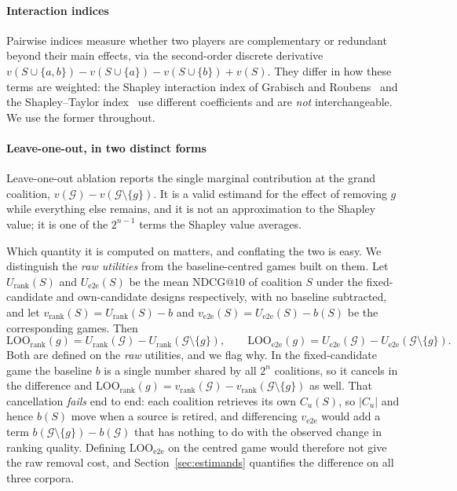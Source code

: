 \documentclass[pdflatex,sn-basic,Numbered]{sn-jnl}
\makeatletter
\theoremstyle{plain}
\theoremstyle{definition}
\newcommand{\G}{\mathcal{G}}
\newcommand{\NDCG}{\mathrm{NDCG@10}}
\newcommand{\LOOr}{\mathrm{LOO}_{\mathrm{rank}}}
\newcommand{\LOOe}{\mathrm{LOO}_{\mathrm{e2e}}}
\makeatother
\begin{document}
\paragraph{Interaction indices}
Pairwise indices measure whether two players are complementary or redundant
beyond their main effects, via the second-order discrete derivative
$v(S\cup\{a,b\}) - v(S\cup\{a\}) - v(S\cup\{b\}) + v(S)$. They differ in how
these terms are weighted: the Shapley interaction index of Grabisch and
Roubens~\citep{grabisch1999interaction} and the Shapley--Taylor
index~\citep{sundararajan2020shapleytaylor} use different coefficients and are
\emph{not} interchangeable. We use the former throughout.

\paragraph{Leave-one-out, in two distinct forms}
Leave-one-out ablation reports the single marginal contribution at the grand
coalition, $v(\G) - v(\G\setminus\{g\})$. It is a valid estimand for the effect
of removing $g$ while everything else remains, and it is not an approximation
to the Shapley value; it is one of the $2^{n-1}$ terms the Shapley value
averages.

Which quantity it is computed on matters, and conflating the two is easy. We
distinguish the \emph{raw utilities} from the baseline-centred games built on
them. Let $U_{\mathrm{rank}}(S)$ and $U_{\mathrm{e2e}}(S)$ be the mean
$\NDCG$ of coalition $S$ under the fixed-candidate and own-candidate designs
respectively, with no baseline subtracted, and let
$v_{\mathrm{rank}}(S) = U_{\mathrm{rank}}(S) - b$ and
$v_{\mathrm{e2e}}(S) = U_{\mathrm{e2e}}(S) - b(S)$ be the corresponding games.
Then
%
\begin{equation}
\LOOr(g) = U_{\mathrm{rank}}(\G) - U_{\mathrm{rank}}(\G\setminus\{g\}),
\qquad
\LOOe(g) = U_{\mathrm{e2e}}(\G) - U_{\mathrm{e2e}}(\G\setminus\{g\}).
\label{eq:loo}
\end{equation}
%
Both are defined on the \emph{raw} utilities, and we flag why. In the
fixed-candidate game the baseline $b$ is a single number shared by all $2^n$
coalitions, so it cancels in the difference and
$\LOOr(g) = v_{\mathrm{rank}}(\G) - v_{\mathrm{rank}}(\G\setminus\{g\})$ as
well. That cancellation \emph{fails} end to end: each coalition retrieves its
own $C_u(S)$, so $|C_u|$ and hence $b(S)$ move when a source is retired, and
differencing $v_{\mathrm{e2e}}$ would add a term $b(\G\setminus\{g\}) - b(\G)$
that has nothing to do with the observed change in ranking quality. Defining
$\LOOe$ on the centred game would therefore not give the raw removal cost, and
Section~\ref{sec:estimands} quantifies the difference on all three corpora.
\end{document}
